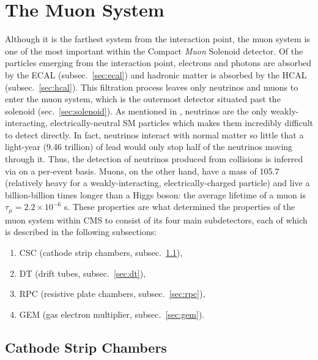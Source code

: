 \section{The Muon System}
\label{sec:muon_sys}

Although it is the farthest system from the interaction point, the muon system is one of the most important within the Compact \emph{Muon} Solenoid detector.
Of the particles emerging from the interaction point, electrons and photons are absorbed by the ECAL (subsec.~\ref{sec:ecal}) and hadronic matter is absorbed by the HCAL (subsec.~\ref{sec:hcal}).
This filtration process leaves only neutrinos and muons to enter the muon system, which is the outermost detector situated past the solenoid (sec.~\ref{sec:solenoid}).
As mentioned in
, neutrinos are the only weakly-interacting, electrically-neutral SM particles which makes them incredibly difficult to detect directly.
In fact, neutrinos interact with normal matter so little that a light-year (9.46 trillion\Km) of lead would only stop half of the neutrinos moving through it.
Thus, the detection of neutrinos produced from \pp collisions is inferred via \MET on a per-event basis.
Muons, on the other hand, have a mass of 105.7 \MeV (relatively heavy for a weakly-interacting, electrically-charged particle) and live a billion-billion times longer than a Higgs boson: the average lifetime of a muon is $\tau_{\mu} = 2.2 \times 10^{-6}$ s.
These properties are what determined the properties of the muon system within CMS to consist of its four main subdetectors, each of which is described in the following subsections:
\begin{enumerate}
    \item CSC (cathode strip chambers, subsec.~\ref{sec:csc}),
    \item DT (drift tubes, subsec.~\ref{sec:dt}),
    \item RPC (resistive plate chambers, subsec.~\ref{sec:rpc}),
    \item GEM (gas electron multiplier, subsec.~\ref{sec:gem}).
\end{enumerate}

\subsection{Cathode Strip Chambers}
\label{sec:csc}


